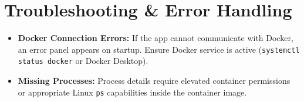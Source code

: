\section{Troubleshooting \& Error Handling}
\begin{itemize}
    \item \textbf{Docker Connection Errors:} If the app cannot communicate with Docker, an error panel appears on startup. Ensure Docker service is active (\texttt{systemctl status docker} or Docker Desktop).
    \item \textbf{Missing Processes:} Process details require elevated container permissions or appropriate Linux \texttt{ps} capabilities inside the container image.
\end{itemize}
